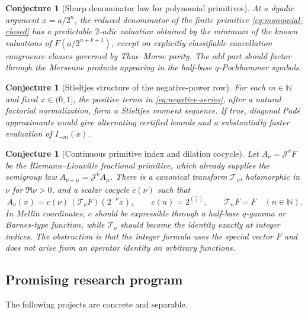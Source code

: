\documentclass[11pt,oneside]{article}
\numberwithin{equation}{section}
\newtheorem{conjecture}[theorem]{Conjecture}
\theoremstyle{definition}
\theoremstyle{remark}
\newcommand{\N}{\mathbb N}
\newcommand{\Vol}{\mathcal J}
\begin{document}
\begin{conjecture}[Sharp denominator law for polynomial primitives]
\label{conj:denominator}
At a dyadic argument $x=a/2^n$, the reduced denominator of the finite primitive
\eqref{eq:monomial-closed} has a predictable $2$-adic valuation obtained by the
minimum of the known valuations of
$F(a/2^{n+k+1})$, except on explicitly classifiable cancellation congruence
classes governed by Thue--Morse parity.  The odd part should factor through the
Mersenne products appearing in the half-base $q$-Pochhammer symbols.
\end{conjecture}

\begin{conjecture}[Stieltjes structure of the negative-power row]
\label{conj:stieltjes}
For each $m\in\N$ and fixed $x\in(0,1]$, the positive terms in
\eqref{eq:negative-series}, after a natural factorial normalization, form a
Stieltjes moment sequence.  If true, diagonal Pad\'e approximants would give
alternating certified bounds and a substantially faster evaluation of
$I_{-m}(x)$.
\end{conjecture}

\begin{conjecture}[Continuous primitive index and dilation cocycle]
\label{conj:fractional-index}
Let $A_\nu=\Vol^\nu F$ be the Riemann--Liouville fractional primitive, which
already supplies the semigroup law $A_{\nu+\mu}=\Vol^\nu A_\mu$.  There is a
canonical transform $\mathscr T_\nu$, holomorphic in $\nu$ for $\Re\nu>0$, and
a scalar cocycle $c(\nu)$ such that
\[
 A_\nu(x)=c(\nu)\,(\mathscr T_\nu F)(2^{-\nu}x),
 \qquad c(n)=2^{\binom n2},\qquad \mathscr T_nF=F
 \quad(n\in\N).
\]
In Mellin coordinates, $c$ should be expressible through a half-base
$q$-gamma or Barnes-type function, while $\mathscr T_\nu$ should become the
identity exactly at integer indices.  The obstruction is that the integer
formula uses the special vector $F$ and does not arise from an operator
identity on arbitrary functions.
\end{conjecture}

\subsection{Promising research program}
The following projects are concrete and separable.
\end{document}
